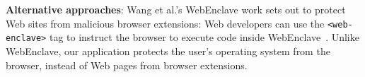 \textbf{Alternative approaches}:
Wang et al.'s WebEnclave work sets out to protect Web sites from malicious
browser extensions: Web developers can use the \texttt{<web-enclave>} tag to
instruct the browser to execute code inside WebEnclave~\cite{Wang2021a}.  Unlike
WebEnclave, our application protects the user's operating system from the
browser, instead of Web pages from browser extensions.
